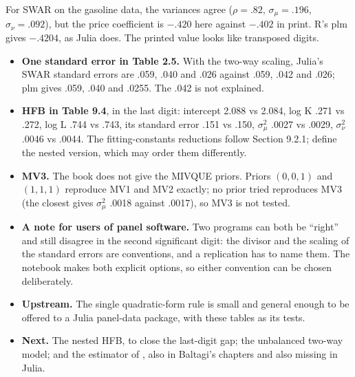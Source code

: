For SWAR on the gasoline data, the variances agree ($\rho = .82$, $\sigma_\mu = .196$, $\sigma_\nu = .092$), but the price
coefficient is $-.420$ here against $-.402$ in print. R's plm gives $-.4204$, as Julia does. The printed value looks like
transposed digits.

\begin{itemize}
  \item \textbf{One standard error in Table 2.5.} With the two-way scaling, Julia's SWAR standard errors are .059, .040 and
    .026 against .059, .042 and .026; plm gives .059, .040 and .0255. The .042 is not explained.
  \item \textbf{HFB in Table 9.4}, in the last digit: intercept 2.088 vs 2.084, log K .271 vs .272, log L .744 vs .743,
    its standard error .151 vs .150, $\sigma_\mu^2$ .0027 vs .0029, $\sigma_\nu^2$ .0046 vs .0044. The fitting-constants
    reductions follow Section 9.2.1;  define the nested version, which may order them differently.
  \item \textbf{MV3.} The book does not give the MIVQUE priors. Priors $(0,0,1)$ and $(1,1,1)$ reproduce MV1 and MV2
    exactly; no prior tried reproduces MV3 (the closest gives $\sigma_\mu^2$ .0018 against .0017), so MV3 is not tested.
\end{itemize}

\begin{itemize}
  \item \textbf{A note for users of panel software.} Two programs can both be ``right'' and still disagree in the second
    significant digit: the divisor and the scaling of the standard errors are conventions, and a replication has to name them.
    The notebook makes both explicit options, so either convention can be chosen deliberately.
  \item \textbf{Upstream.} The single quadratic-form rule is small and general enough to be offered to a Julia panel-data
    package, with these tables as its tests.
  \item \textbf{Next.} The  nested HFB, to close the last-digit gap; the unbalanced two-way model;
    and the estimator of , also in Baltagi's chapters and also missing in Julia.
\end{itemize}


